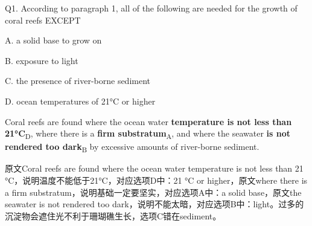 \begin{blk}
    \begin{qst}
        Q1. According to paragraph 1, all of the following are needed for the growth of coral reefs EXCEPT
    \end{qst}

    \begin{chc}
        A. a solid base to grow on

        B. exposure to light

        C. the presence of river-borne sediment

        D. ocean temperatures of 21°C or higher
    \end{chc}

    \begin{psgq}
        Coral reefs are found where the ocean water \textbf{temperature is not less than 21°C}\textsubscript{D}, where there is a \textbf{firm substratum}\textsubscript{A}, and where the seawater \textbf{is not rendered too dark}\textsubscript{B} by excessive amounts of river-borne sediment.
    \end{psgq}

    \begin{nlz}
        原文Coral reefs are found where the ocean water temperature is not less than 21 °C，说明温度不能低于21°C，对应选项D中：21 °C or higher，原文where there is a firm substratum，说明基础一定要坚实，对应选项A中：a solid base，原文the seawater is not rendered too dark，说明不能太暗，对应选项B中：light。过多的沉淀物会遮住光不利于珊瑚礁生长，选项C错在sediment。
    \end{nlz}
\end{blk}

